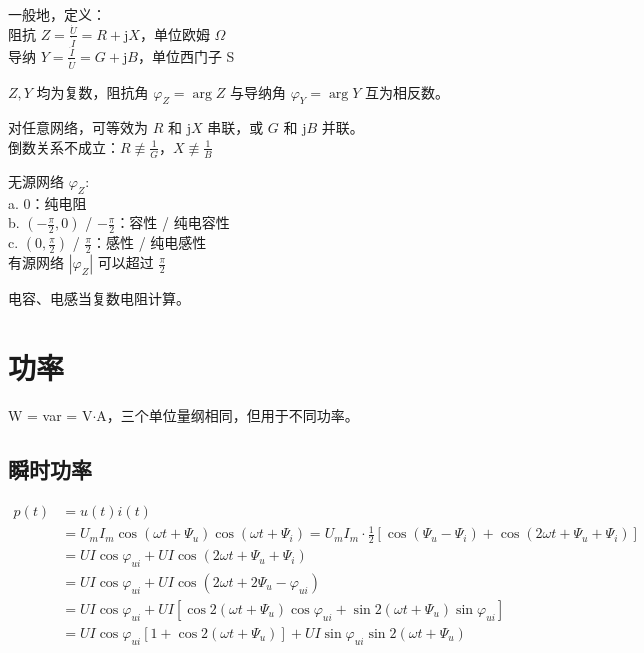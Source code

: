 \documentclass[12pt, a4paper, UTF8, openany]{ctexbook}
\newcommand{\unit}{\mathrm{j}}
\begin{document}
        一般地，定义：\\
        阻抗 $Z = \frac{\dot{U}}{\dot{I}} = R + \unit X$，单位欧姆 $\Omega$ \\
        导纳 $Y = \frac{\dot{I}}{\dot{U}} = G + \unit B$，单位西门子 S

        $Z, Y$ 均为复数，阻抗角 $\varphi_Z = \arg Z$ 与导纳角 $\varphi_Y = \arg Y$ 互为相反数。

        对任意网络，可等效为 $R$ 和 $\unit X$ 串联，或 $G$ 和 $\unit B$ 并联。\\
        {\heiti 倒数关系不成立}：$R \not\equiv \frac{1}{G}$，$X \not\equiv \frac{1}{B}$

        无源网络 $\varphi_Z$: \\
        a. $0$：纯电阻 \\
        b. $(-\frac{\pi}{2}, 0)$ / $-\frac{\pi}{2}$：容性 / 纯电容性 \\
        c. $(0, \frac{\pi}{2})$ / $\frac{\pi}{2}$：感性 / 纯电感性 \\
        有源网络 $|\varphi_Z|$ 可以超过 $\frac{\pi}{2}$

        电容、电感当复数电阻计算。

        \section{功率}
        W = var = V$\cdot$A，三个单位量纲相同，但用于不同功率。

        \subsection{瞬时功率}
        $$\begin{aligned}
            p(t) &= u(t) i(t) \\
            &= U_m I_m \cos(\omega t + \Psi_u) \cos(\omega t + \Psi_i) = U_m I_m \cdot \frac{1}{2}[ \cos(\Psi_u - \Psi_i) + \cos(2 \omega t + \Psi_u + \Psi_i) ] \\
            &= \boxed{UI \cos\varphi_{ui}} + \boxed{UI\cos(2 \omega t + \Psi_u + \Psi_i)} \\
            &= UI \cos\varphi_{ui} + UI \cos(2 \omega t + 2\Psi_u - \varphi_{ui}) \\
            &= UI \cos\varphi_{ui} + UI [\cos 2(\omega t + \Psi_u) \cos \varphi_{ui} + \sin 2(\omega t + \Psi_u) \sin\varphi_{ui}] \\
            &= \boxed{UI \cos\varphi_{ui} [1 + \cos 2(\omega t + \Psi_u)]} + \boxed{UI \sin\varphi_{ui} \sin 2(\omega t + \Psi_u)}
        \end{aligned}$$
\end{document}
